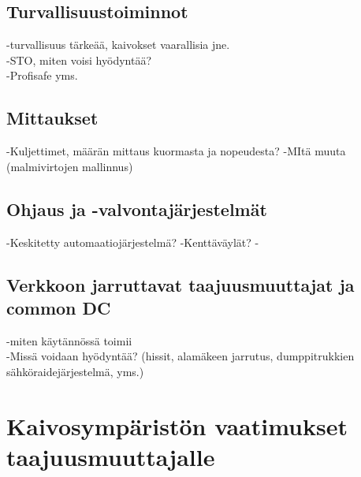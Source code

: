\documentclass[finnish,12pt,a4paper,pdftex,elec,utf8]{aaltothesis}
\begin{document}
\subsection{Turvallisuustoiminnot}
-turvallisuus tärkeää, kaivokset vaarallisia jne.\\
-STO, miten voisi hyödyntää?\\
-Profisafe yms.

\subsection{Mittaukset}
-Kuljettimet, määrän mittaus kuormasta ja nopeudesta?
-MItä muuta (malmivirtojen mallinnus)

\subsection{Ohjaus ja -valvontajärjestelmät}
-Keskitetty automaatiojärjestelmä?
-Kenttäväylät?
-
\subsection{Verkkoon jarruttavat taajuusmuuttajat ja common DC}
-miten käytännössä toimii\\
-Missä voidaan hyödyntää? (hissit, alamäkeen jarrutus, dumppitrukkien sähköraidejärjestelmä, yms.)

\clearpage

\section{Kaivosympäristön vaatimukset taajuusmuuttajalle}
\end{document}
